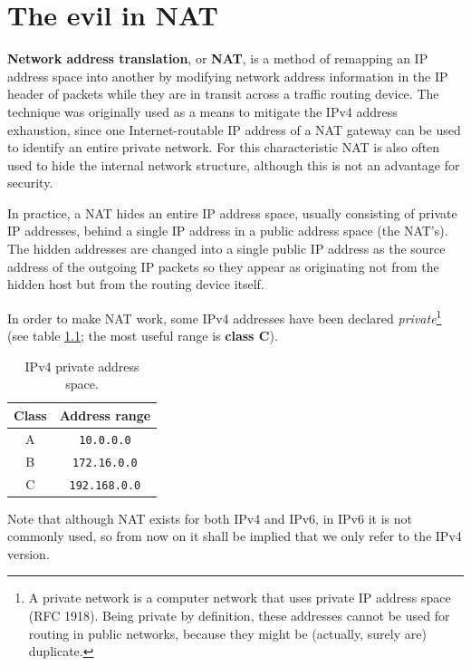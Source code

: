 \chapter{The evil in NAT}
\label{ch:nat}
\textbf{Network address translation}, or \textbf{NAT}, is a method of remapping an IP address space into another by modifying network address information in the IP header of packets while they are in transit across a traffic routing device. The technique was originally used as a means to mitigate the IPv4 address exhaustion, since one Internet-routable IP address of a NAT gateway can be used to identify an entire private network. For this characteristic NAT is also often used to hide the internal network structure, although this is not an advantage for security.

In practice, a NAT hides an entire IP address space, usually consisting of private IP addresses, behind a single IP address in a public address space (the NAT's). The hidden addresses are changed into a single public IP address as the source address of the outgoing IP packets so they appear as originating not from the hidden host but from the routing device itself.

In order to make NAT work, some IPv4 addresses have been declared \textit{private}\footnote{A private network is a computer network that uses private IP address space (RFC 1918). Being private by definition, these addresses cannot be used for routing in public networks, because they might be (actually, surely are) duplicate.} (see table \ref{tab:ipv4_private}; the most useful range is \textbf{class C}).

\begin{table}[h]
    \centering
    \begin{tabular}{|c|c|}
        \hline
        \textbf{Class} & \textbf{Address range} \\
        \hline
        A & \texttt{10.0.0.0} \\
        B & \texttt{172.16.0.0} \\
        C & \texttt{192.168.0.0} \\
        \hline
    \end{tabular}
        \caption{IPv4 private address space.}
        \label{tab:ipv4_private}
\end{table}

Note that although NAT exists for both IPv4 and IPv6, in IPv6 it is not commonly used, so from now on it shall be implied that we only refer to the IPv4 version.

